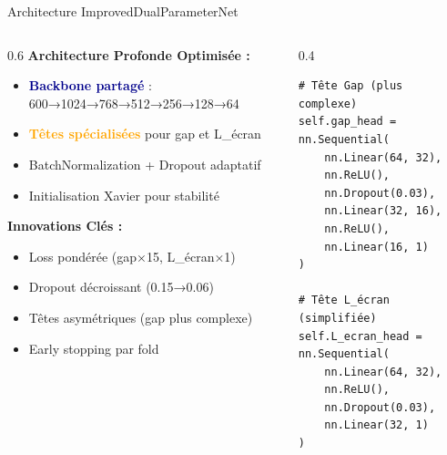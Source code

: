 \documentclass[aspectratio=169]{beamer}
\begin{document}
\begin{frame}[fragile]{Architecture ImprovedDualParameterNet}
    \begin{columns}
        \begin{column}{0.6\textwidth}
            \textbf{Architecture Profonde Optimisée :}
            \begin{itemize}
                \item \textcolor{darkblue}{\textbf{Backbone partagé}} : 600→1024→768→512→256→128→64
                \item \textcolor{orange}{\textbf{Têtes spécialisées}} pour gap et L\_écran
                \item BatchNormalization + Dropout adaptatif
                \item Initialisation Xavier pour stabilité
            \end{itemize}
            
            \vspace{0.3cm}
            \textbf{Innovations Clés :}
            \begin{itemize}
                \item Loss pondérée (gap×15, L\_écran×1)
                \item Dropout décroissant (0.15→0.06)
                \item Têtes asymétriques (gap plus complexe)
                \item Early stopping par fold
            \end{itemize}
        \end{column}
        \begin{column}{0.4\textwidth}
            \begin{lstlisting}[caption=Têtes spécialisées]
# Tête Gap (plus complexe)
self.gap_head = nn.Sequential(
    nn.Linear(64, 32),
    nn.ReLU(),
    nn.Dropout(0.03),
    nn.Linear(32, 16),
    nn.ReLU(),
    nn.Linear(16, 1)
)

# Tête L_écran (simplifiée)
self.L_ecran_head = nn.Sequential(
    nn.Linear(64, 32),
    nn.ReLU(),
    nn.Dropout(0.03),
    nn.Linear(32, 1)
)
            \end{lstlisting}
        \end{column}
    \end{columns}
\end{frame}
\end{document}
